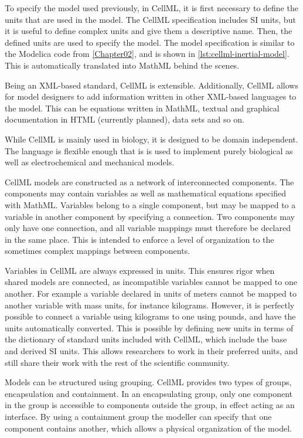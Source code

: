\documentclass[\rootfolder/main.tex]{subfiles}
\begin{document}
To specify the model used previously, in CellML, it is first necessary to define the units that are used in the model.
The CellML specification includes SI units, but it is useful to define complex units and give them a descriptive name.
Then, the defined units are used to specify the model.
The model specification is similar to the Modelica code from \cref{Chapter02}, and is shown in \cref{lst:cellml-inertial-model}.
This is automatically translated into MathML behind the scenes.

Being an XML-based standard, CellML is extensible.
Additionally, CellML allows for model designers to add information written in other XML-based languages to the model.
This can be equations written in MathML, textual and graphical documentation in HTML (currently planned), data sets and so on.

While CellML is mainly used in biology, it is designed to be domain independent.
The language is flexible enough that is is used to implement purely biological as well as electrochemical and mechanical models.

CellML models are constructed as a network of interconnected components.
The components may contain variables as well as mathematical equations specified with MathML.
Variables belong to a single component, but may be mapped to a variable in another component by specifying a connection.
Two components may only have one connection, and all variable mappings must therefore be declared in the same place.
This is intended to enforce a level of organization to the sometimes complex mappings between components.

Variables in CellML are always expressed in units.
This ensures rigor when shared models are connected, as incompatible variables cannot be mapped to one another.
For example a variable declared in units of meters cannot be mapped to another variable with mass units, for instance kilograms.
However, it is perfectly possible to connect a variable using kilograms to one using pounds, and have the units automatically converted.
This is possible by defining new units in terms of the dictionary of standard units included with CellML, which include the base and derived SI units.
This allows researchers to work in their preferred units, and still share their work with the rest of the scientific community.

Models can be structured using grouping.
CellML provides two types of groups, encapsulation and containment.
In an encapsulating group, only one component in the group is accessible to components outside the group, in effect acting as an interface.
By using a containment group the modeller can specify that one component contains another, which allows a physical organization of the model.
\end{document}
